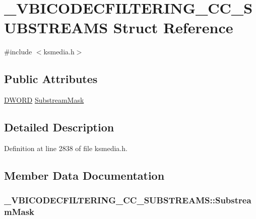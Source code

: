 \hypertarget{struct___v_b_i_c_o_d_e_c_f_i_l_t_e_r_i_n_g___c_c___s_u_b_s_t_r_e_a_m_s}{}\section{\+\_\+\+V\+B\+I\+C\+O\+D\+E\+C\+F\+I\+L\+T\+E\+R\+I\+N\+G\+\_\+\+C\+C\+\_\+\+S\+U\+B\+S\+T\+R\+E\+A\+MS Struct Reference}
\label{struct___v_b_i_c_o_d_e_c_f_i_l_t_e_r_i_n_g___c_c___s_u_b_s_t_r_e_a_m_s}


{\ttfamily \#include $<$ksmedia.\+h$>$}

\subsection*{Public Attributes}
\begin{DoxyCompactItemize}
\item 
\hyperlink{mapinls_8h_ad342ac907eb044443153a22f964bf0af}{D\+W\+O\+RD} \hyperlink{struct___v_b_i_c_o_d_e_c_f_i_l_t_e_r_i_n_g___c_c___s_u_b_s_t_r_e_a_m_s_a3c6ba4a3ae880ae9909dcfecd8a26e3c}{Substream\+Mask}
\end{DoxyCompactItemize}


\subsection{Detailed Description}


Definition at line 2838 of file ksmedia.\+h.



\subsection{Member Data Documentation}
\subsubsection[{\texorpdfstring{Substream\+Mask}{SubstreamMask}}]{ \+\_\+\+V\+B\+I\+C\+O\+D\+E\+C\+F\+I\+L\+T\+E\+R\+I\+N\+G\+\_\+\+C\+C\+\_\+\+S\+U\+B\+S\+T\+R\+E\+A\+M\+S\+::\+Substream\+Mask}\hypertarget{struct___v_b_i_c_o_d_e_c_f_i_l_t_e_r_i_n_g___c_c___s_u_b_s_t_r_e_a_m_s_a3c6ba4a3ae880ae9909dcfecd8a26e3c}{}\label{struct___v_b_i_c_o_d_e_c_f_i_l_t_e_r_i_n_g___c_c___s_u_b_s_t_r_e_a_m_s_a3c6ba4a3ae880ae9909dcfecd8a26e3c}


